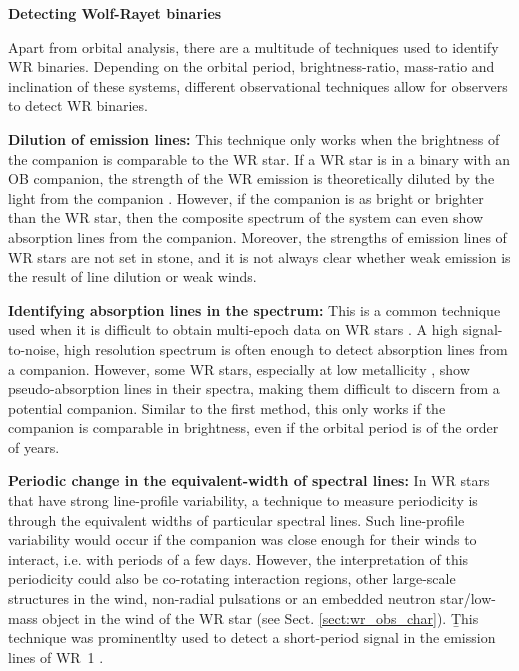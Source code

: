 \textbf{Detecting Wolf-Rayet binaries}\label{sect:detection_methods}

Apart from orbital analysis, there are a multitude of techniques used to identify WR binaries. Depending on the orbital period, brightness-ratio, mass-ratio and inclination of these systems, different observational techniques allow for observers to detect WR binaries.

\textbf{Dilution of emission lines:} This technique only works when the brightness of the companion is comparable to the WR star. If a WR star is in a binary with an OB companion, the strength of the WR emission is theoretically diluted by the light from the companion \citep{1968aSmith,1989ContiMassey,2007Crowther}. However, if the companion is as bright or brighter than the WR star, then the composite spectrum of the system can even show absorption lines from the companion. Moreover, the strengths of emission lines of WR stars are not set in stone, and it is not always clear whether weak emission is the result of line dilution or weak winds.

\textbf{Identifying absorption lines in the spectrum:} This is a common technique used when it is difficult to obtain multi-epoch data on WR stars \citep[e.g.,][]{1989ContiMassey}. A high signal-to-noise, high resolution spectrum is often enough to detect absorption lines from a companion. However, some WR stars, especially at low metallicity \citep[e.g.,][]{hainich_wolf-rayet_2015}, show pseudo-absorption lines in their spectra, making them difficult to discern from a potential companion. Similar to the first method, this only works if the companion is comparable in brightness, even if the orbital period is of the order of years.

\textbf{Periodic change in the equivalent-width of spectral lines:} In WR stars that have strong line-profile variability, a technique to measure periodicity is through the equivalent widths of particular spectral lines. Such line-profile variability would occur if the companion was close enough for their winds to interact, i.e. with periods of a few days. However, the interpretation of this periodicity could also be co-rotating interaction regions, other large-scale structures in the wind, non-radial pulsations or an embedded neutron star/low-mass object in the wind of the WR star (see Sect. \ref{sect:wr_obs_char}). \b{This technique was prominentlty used to detect a short-period signal in the emission lines of WR~1 \citet[][]{morel_investigation_1999}.}

